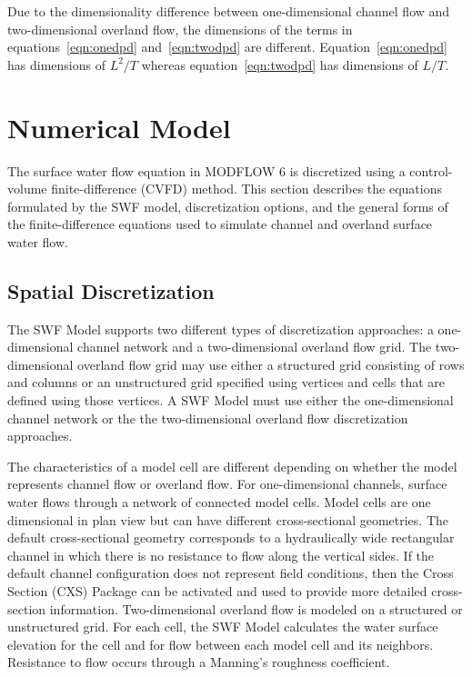 \documentclass[fleqn]{article}
\begin{document}
Due to the dimensionality difference between one-dimensional channel flow and two-dimensional overland flow, the dimensions of the terms in equations~\ref{eqn:onedpd} and~\ref{eqn:twodpd} are different.  Equation~\ref{eqn:onedpd} has dimensions of $L^2/T$ whereas equation~\ref{eqn:twodpd} has dimensions of $L/T$.

\section{Numerical Model}
The surface water flow equation in MODFLOW 6 is discretized using a control-volume finite-difference (CVFD) method. This section describes the equations formulated by the SWF model, discretization options, and the general forms of the finite-difference equations used to simulate channel and overland surface water flow.

\subsection{Spatial Discretization}

The SWF Model supports two different types of discretization approaches: a one-dimensional channel network and a two-dimensional overland flow grid.  The two-dimensional overland flow grid may use either a structured grid consisting of rows and columns or an unstructured grid specified using vertices and cells that are defined using those vertices.  A SWF Model must use either the one-dimensional channel network or the the two-dimensional overland flow discretization approaches.  

The characteristics of a model cell are different depending on whether the model represents channel flow or overland flow.  For one-dimensional channels, surface water flows through a network of connected model cells.  Model cells are one dimensional in plan view but can have different cross-sectional geometries.  The default cross-sectional geometry corresponds to a hydraulically wide rectangular channel in which there is no resistance to flow along the vertical sides.  If the default channel configuration does not represent field conditions, then the Cross Section (CXS) Package can be activated and used to provide more detailed cross-section information.  Two-dimensional overland flow is modeled on a structured or unstructured grid.  For each cell, the SWF Model calculates the water surface elevation for the cell and for flow between each model cell and its neighbors.  Resistance to flow occurs through a Manning's roughness coefficient.
\end{document}
